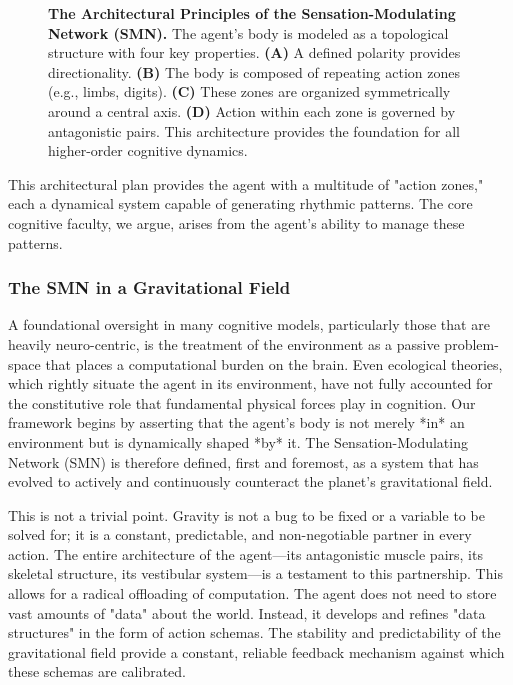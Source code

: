 \begin{figure}[ht]
    \centering
    \caption{\textbf{The Architectural Principles of the Sensation-Modulating Network (SMN).} The agent's body is modeled as a topological structure with four key properties. \textbf{(A)} A defined polarity provides directionality. \textbf{(B)} The body is composed of repeating action zones (e.g., limbs, digits). \textbf{(C)} These zones are organized symmetrically around a central axis. \textbf{(D)} Action within each zone is governed by antagonistic pairs. This architecture provides the foundation for all higher-order cognitive dynamics.}
    \label{fig:smn_architecture}
\end{figure}

This architectural plan provides the agent with a multitude of "action zones," each a dynamical system capable of generating rhythmic patterns. The core cognitive faculty, we argue, arises from the agent's ability to manage these patterns.


\subsubsection{The SMN in a Gravitational Field}
\label{ssubsec:gravity}
A foundational oversight in many cognitive models, particularly those that are heavily neuro-centric, is the treatment of the environment as a passive problem-space that places a computational burden on the brain. Even ecological theories, which rightly situate the agent in its environment, have not fully accounted for the constitutive role that fundamental physical forces play in cognition. Our framework begins by asserting that the agent’s body is not merely *in* an environment but is dynamically shaped *by* it. The Sensation-Modulating Network (SMN) is therefore defined, first and foremost, as a system that has evolved to actively and continuously counteract the planet's gravitational field.

This is not a trivial point. Gravity is not a bug to be fixed or a variable to be solved for; it is a constant, predictable, and non-negotiable partner in every action. The entire architecture of the agent—its antagonistic muscle pairs, its skeletal structure, its vestibular system—is a testament to this partnership. This allows for a radical offloading of computation. The agent does not need to store vast amounts of "data" about the world. Instead, it develops and refines "data structures" in the form of action schemas. The stability and predictability of the gravitational field provide a constant, reliable feedback mechanism against which these schemas are calibrated.


